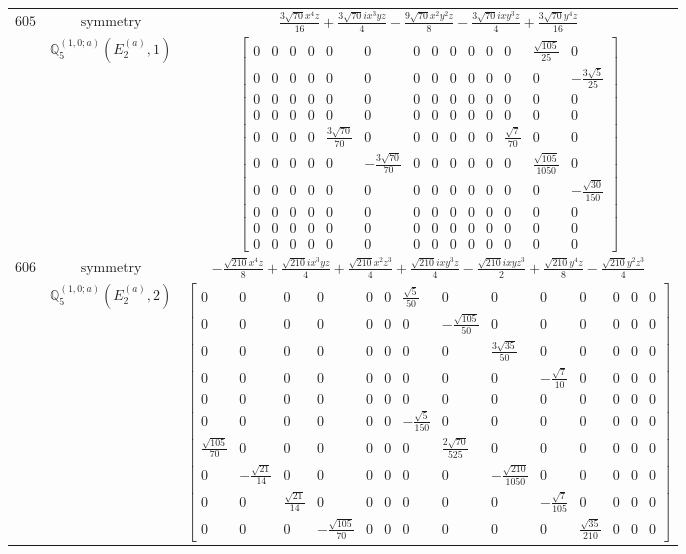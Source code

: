 \documentclass[fleqn,8pt,landscape]{jsarticle}
\begin{document}
\begin{longtable}{ccc}
$ 605 $ & $ \text{symmetry} $ & $ \frac{3 \sqrt{70} x^{4} z}{16} + \frac{3 \sqrt{70} i x^{3} y z}{4} - \frac{9 \sqrt{70} x^{2} y^{2} z}{8} - \frac{3 \sqrt{70} i x y^{3} z}{4} + \frac{3 \sqrt{70} y^{4} z}{16} $ \\
$  $ & $ \mathbb{Q}_{5}^{(1,0;a)}(E_{2}^{(a)},1) $ & $ \begin{bmatrix} 0 & 0 & 0 & 0 & 0 & 0 & 0 & 0 & 0 & 0 & 0 & 0 & \frac{\sqrt{105}}{25} & 0 \\ 0 & 0 & 0 & 0 & 0 & 0 & 0 & 0 & 0 & 0 & 0 & 0 & 0 & - \frac{3 \sqrt{5}}{25} \\ 0 & 0 & 0 & 0 & 0 & 0 & 0 & 0 & 0 & 0 & 0 & 0 & 0 & 0 \\ 0 & 0 & 0 & 0 & 0 & 0 & 0 & 0 & 0 & 0 & 0 & 0 & 0 & 0 \\ 0 & 0 & 0 & 0 & \frac{3 \sqrt{70}}{70} & 0 & 0 & 0 & 0 & 0 & 0 & \frac{\sqrt{7}}{70} & 0 & 0 \\ 0 & 0 & 0 & 0 & 0 & - \frac{3 \sqrt{70}}{70} & 0 & 0 & 0 & 0 & 0 & 0 & \frac{\sqrt{105}}{1050} & 0 \\ 0 & 0 & 0 & 0 & 0 & 0 & 0 & 0 & 0 & 0 & 0 & 0 & 0 & - \frac{\sqrt{30}}{150} \\ 0 & 0 & 0 & 0 & 0 & 0 & 0 & 0 & 0 & 0 & 0 & 0 & 0 & 0 \\ 0 & 0 & 0 & 0 & 0 & 0 & 0 & 0 & 0 & 0 & 0 & 0 & 0 & 0 \\ 0 & 0 & 0 & 0 & 0 & 0 & 0 & 0 & 0 & 0 & 0 & 0 & 0 & 0 \end{bmatrix} $ \\ \hline
$ 606 $ & $ \text{symmetry} $ & $ - \frac{\sqrt{210} x^{4} z}{8} + \frac{\sqrt{210} i x^{3} y z}{4} + \frac{\sqrt{210} x^{2} z^{3}}{4} + \frac{\sqrt{210} i x y^{3} z}{4} - \frac{\sqrt{210} i x y z^{3}}{2} + \frac{\sqrt{210} y^{4} z}{8} - \frac{\sqrt{210} y^{2} z^{3}}{4} $ \\
$  $ & $ \mathbb{Q}_{5}^{(1,0;a)}(E_{2}^{(a)},2) $ & $ \begin{bmatrix} 0 & 0 & 0 & 0 & 0 & 0 & \frac{\sqrt{5}}{50} & 0 & 0 & 0 & 0 & 0 & 0 & 0 \\ 0 & 0 & 0 & 0 & 0 & 0 & 0 & - \frac{\sqrt{105}}{50} & 0 & 0 & 0 & 0 & 0 & 0 \\ 0 & 0 & 0 & 0 & 0 & 0 & 0 & 0 & \frac{3 \sqrt{35}}{50} & 0 & 0 & 0 & 0 & 0 \\ 0 & 0 & 0 & 0 & 0 & 0 & 0 & 0 & 0 & - \frac{\sqrt{7}}{10} & 0 & 0 & 0 & 0 \\ 0 & 0 & 0 & 0 & 0 & 0 & 0 & 0 & 0 & 0 & 0 & 0 & 0 & 0 \\ 0 & 0 & 0 & 0 & 0 & 0 & - \frac{\sqrt{5}}{150} & 0 & 0 & 0 & 0 & 0 & 0 & 0 \\ \frac{\sqrt{105}}{70} & 0 & 0 & 0 & 0 & 0 & 0 & \frac{2 \sqrt{70}}{525} & 0 & 0 & 0 & 0 & 0 & 0 \\ 0 & - \frac{\sqrt{21}}{14} & 0 & 0 & 0 & 0 & 0 & 0 & - \frac{\sqrt{210}}{1050} & 0 & 0 & 0 & 0 & 0 \\ 0 & 0 & \frac{\sqrt{21}}{14} & 0 & 0 & 0 & 0 & 0 & 0 & - \frac{\sqrt{7}}{105} & 0 & 0 & 0 & 0 \\ 0 & 0 & 0 & - \frac{\sqrt{105}}{70} & 0 & 0 & 0 & 0 & 0 & 0 & \frac{\sqrt{35}}{210} & 0 & 0 & 0 \end{bmatrix} $ \\ \hline

\end{longtable}
\end{document}
